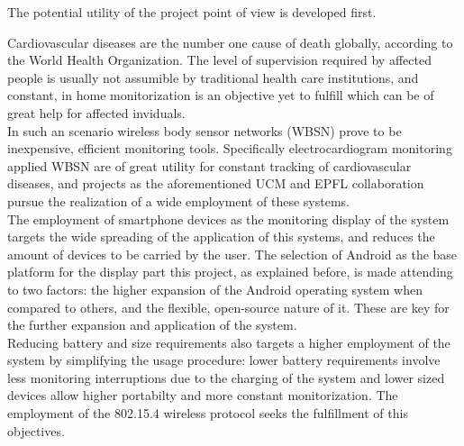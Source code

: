 		The potential utility of the project point of view is developed first.\\

		\begin{comment}
		x CardioVascular Diseases (CVD) as high risk, expanded cause of death (citamos a la OMS)
		x WBSN as a cheap, efficient method of monitoring, particularly ECG monitoring for CVD preventing.
		x Smartphones as ubiquous monitoring window.
		x EPFL's shimmer + iPhone bluetooth monitoring system.
		x Bluetooth battery requirements don't suffice for expected device usage time.
		x 802.15.4 as a more efficient alternative.
		x Smartphones not equipped with 802.15.4 -> Development of a receiver device.
		x Android as more open, flexible, expanded platform than iOS.
		x .·. Android + 802.15.4 (through a receiver device) + shimmer for continous ECG monitoring.
		\end{comment}

		Cardiovascular diseases are the number one cause of death globally, according to the World Health Organization. The level of supervision required by affected people is usually not assumible by traditional health care institutions, and constant, in home monitorization is an objective yet to fulfill which can be of great help for affected inviduals.\\

		In such an scenario wireless body sensor networks (WBSN) prove to be inexpensive, efficient monitoring tools. Specifically electrocardiogram monitoring applied WBSN are of great utility for constant tracking of cardiovascular diseases, and projects as the aforementioned UCM and EPFL collaboration pursue the realization of a wide employment of these systems.\\

		The employment of smartphone devices as the monitoring display of the system targets the wide spreading of the application of this systems, and reduces the amount of devices to be carried by the user. The selection of Android as the base platform for the display part this project, as explained before, is made attending to two factors: the higher expansion of the Android operating system when compared to others, and the flexible, open-source nature of it. These are key for the further expansion and application of the system.\\

		Reducing battery and size requirements also targets a higher employment of the system by simplifying the usage procedure: lower battery requirements involve less monitoring interruptions due to the charging of the system and lower sized devices allow higher portabilty and more constant monitorization. The employment of the 802.15.4 wireless protocol seeks the fulfillment of this objectives.\\

